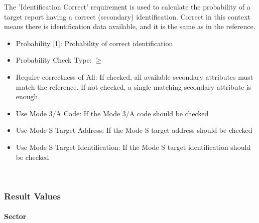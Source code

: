 The 'Identification Correct' requirement is used to calculate the probability of a target report having a correct (secondary) identification. Correct in this context means there is identification data available, and it is the same as in the reference. \\

\begin{itemize}  
\item Probability [1]: Probability of correct identification
\item Probability Check Type: $\geq$
\item Require correctness of All: If checked, all available secondary attributes must match the reference. If not checked, a single matching secondary attribute is enough.
\item Use Mode 3/A Code: If the Mode 3/A code should be checked
\item Use Mode S Target Address: If the Mode S target address should be checked
\item Use Mode S Target Identification: If the Mode S target identification should be checked
\end{itemize}
\ \\

\subsubsection{Result Values}

\paragraph{Sector}

